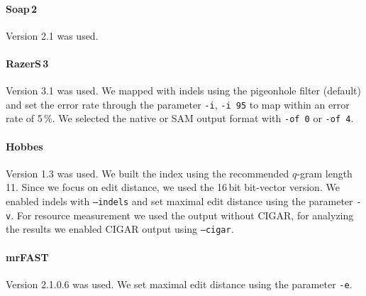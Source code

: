 \paragraph{Soap\,2}
Version 2.1 was used.

\paragraph{RazerS\,3}
Version 3.1 was used.
We mapped with indels using the pigeonhole filter (default) and set the error rate through the parameter \texttt{-i}, \eg \texttt{-i 95} to map within an error rate of 5\,\%.
We selected the native or SAM output format with \texttt{-of 0} or \texttt{-of 4}.

\paragraph{Hobbes}
Version 1.3 was used.
We built the index using the recommended
$q$-gram length 11.
Since we focus on edit distance, we used the 16\,bit bit-vector version.%
We enabled indels with \texttt{--indels} and set maximal edit distance using the parameter \texttt{-v}.
For resource measurement we used the output without CIGAR, for analyzing the results we enabled CIGAR output using \texttt{--cigar}.

\paragraph{mrFAST}
Version 2.1.0.6 was used.
We set maximal edit distance using the parameter \texttt{-e}.

